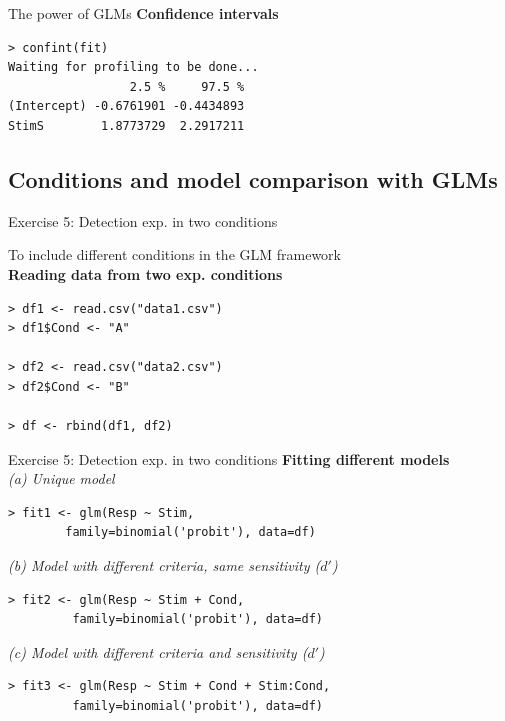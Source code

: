 \documentclass[10pt]{beamer}
\begin{document}
\begin{frame}[fragile]{The power of GLMs}
\textbf{Confidence intervals}
\begin{verbatim}
> confint(fit)
Waiting for profiling to be done...
                 2.5 %     97.5 %
(Intercept) -0.6761901 -0.4434893
StimS        1.8773729  2.2917211
\end{verbatim}


\end{frame}


\subsection{Conditions and model comparison with GLMs}
\begin{frame}[fragile]{Exercise 5: Detection exp. in two conditions}

To include different conditions in the GLM framework \\[10pt]

\textbf{Reading data from two exp. conditions}
\begin{verbatim}
> df1 <- read.csv("data1.csv")
> df1$Cond <- "A"

> df2 <- read.csv("data2.csv")
> df2$Cond <- "B"

> df <- rbind(df1, df2)
\end{verbatim}
\end{frame}

\begin{frame}[fragile]{Exercise 5: Detection exp. in two conditions}
\textbf{Fitting different models}\\[10pt]
\textit{(a) Unique model}
\begin{verbatim}
> fit1 <- glm(Resp ~ Stim, 
        family=binomial('probit'), data=df)
\end{verbatim}

\textit{(b) Model with different criteria, same sensitivity ($d'$)}
\begin{verbatim}
> fit2 <- glm(Resp ~ Stim + Cond, 
         family=binomial('probit'), data=df)
\end{verbatim}

\textit{(c) Model with different criteria and sensitivity ($d'$)}
\begin{verbatim}
> fit3 <- glm(Resp ~ Stim + Cond + Stim:Cond, 
         family=binomial('probit'), data=df)
\end{verbatim}

\end{frame}
\end{document}

